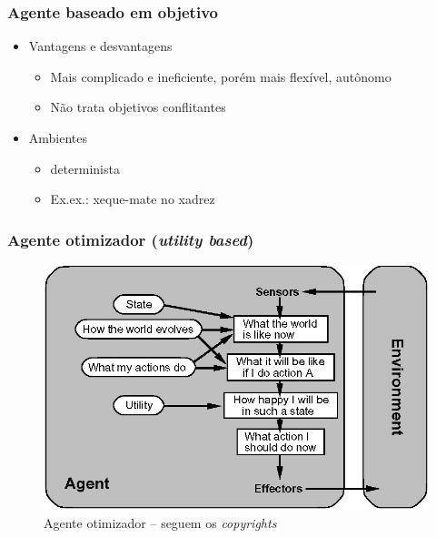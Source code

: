 
\begin{frame} %

    \frametitle{Agente baseado em objetivo}

\begin{itemize}
  \item Vantagens e desvantagens

  \begin{itemize}
    \item Mais complicado e ineficiente,  porém mais flexível, autônomo
    \item Não trata objetivos conflitantes
  \end{itemize}
  
  \item Ambientes

\begin{itemize}
  \item determinista 
  \item Ex.ex.: xeque-mate no xadrez
\end{itemize}
  
\end{itemize}
\end{frame}



\begin{frame} %

 \frametitle{Agente otimizador (\textit{utility based})}

\begin{figure}[!ht]
  \centering
  \includegraphics[height =.6\textheight,width=.7\textwidth]
  {figuras/agente_otimizador.jpg}
  \caption{Agente otimizador -- seguem os \textit{copyrights}}
\end{figure}

\end{frame}



